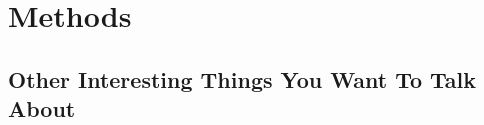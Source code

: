 \section{Methods} \label{section:methods}


\subsection{Other Interesting Things You Want To Talk About}
